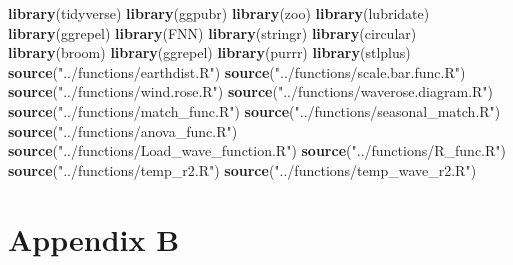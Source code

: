 \documentclass[10pt,a4,]{article}
\newenvironment{Shaded}{\begin{snugshade}}{\end{snugshade}}
\newcommand{\KeywordTok}[1]{\textcolor[rgb]{0.13,0.29,0.53}{\textbf{#1}}}
\newcommand{\NormalTok}[1]{#1}
\newcommand{\StringTok}[1]{\textcolor[rgb]{0.31,0.60,0.02}{#1}}
\begin{document}
\begin{Shaded}
\begin{Highlighting}[]
\KeywordTok{library}\NormalTok{(tidyverse)}
\KeywordTok{library}\NormalTok{(ggpubr)}
\KeywordTok{library}\NormalTok{(zoo)}
\KeywordTok{library}\NormalTok{(lubridate)}
\KeywordTok{library}\NormalTok{(ggrepel)}
\KeywordTok{library}\NormalTok{(FNN)}
\KeywordTok{library}\NormalTok{(stringr)}
\KeywordTok{library}\NormalTok{(circular)}
\KeywordTok{library}\NormalTok{(broom)}
\KeywordTok{library}\NormalTok{(ggrepel)}
\KeywordTok{library}\NormalTok{(purrr)}
\KeywordTok{library}\NormalTok{(stlplus)}
\KeywordTok{source}\NormalTok{(}\StringTok{"../functions/earthdist.R"}\NormalTok{)}
\KeywordTok{source}\NormalTok{(}\StringTok{"../functions/scale.bar.func.R"}\NormalTok{)}
\KeywordTok{source}\NormalTok{(}\StringTok{"../functions/wind.rose.R"}\NormalTok{)}
\KeywordTok{source}\NormalTok{(}\StringTok{"../functions/waverose.diagram.R"}\NormalTok{)}
\KeywordTok{source}\NormalTok{(}\StringTok{"../functions/match_func.R"}\NormalTok{)}
\KeywordTok{source}\NormalTok{(}\StringTok{"../functions/seasonal_match.R"}\NormalTok{)}
\KeywordTok{source}\NormalTok{(}\StringTok{"../functions/anova_func.R"}\NormalTok{)}
\KeywordTok{source}\NormalTok{(}\StringTok{"../functions/Load_wave_function.R"}\NormalTok{)}
\KeywordTok{source}\NormalTok{(}\StringTok{"../functions/R_func.R"}\NormalTok{)}
\KeywordTok{source}\NormalTok{(}\StringTok{"../functions/temp_r2.R"}\NormalTok{)}
\KeywordTok{source}\NormalTok{(}\StringTok{"../functions/temp_wave_r2.R"}\NormalTok{)}
\end{Highlighting}
\end{Shaded}

\newpage

\section*{\large{Appendix B}}
\end{document}

